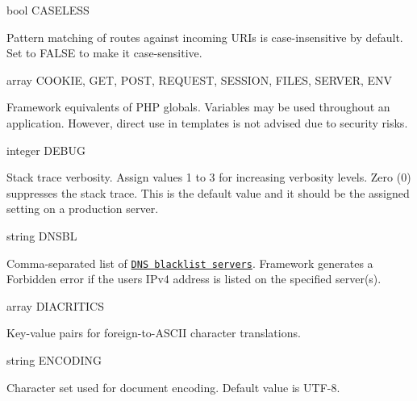 {\ttfamily bool C\+A\+S\+E\+L\+E\+SS}


\begin{DoxyItemize}
\item Pattern matching of routes against incoming U\+R\+Is is case-\/insensitive by default. Set to {\ttfamily F\+A\+L\+SE} to make it case-\/sensitive.
\end{DoxyItemize}

{\ttfamily array C\+O\+O\+K\+IE, G\+ET, P\+O\+ST, R\+E\+Q\+U\+E\+ST, S\+E\+S\+S\+I\+ON, F\+I\+L\+ES, S\+E\+R\+V\+ER, E\+NV}


\begin{DoxyItemize}
\item Framework equivalents of P\+HP globals. Variables may be used throughout an application. However, direct use in templates is not advised due to security risks.
\end{DoxyItemize}

{\ttfamily integer D\+E\+B\+UG}


\begin{DoxyItemize}
\item Stack trace verbosity. Assign values 1 to 3 for increasing verbosity levels. Zero (0) suppresses the stack trace. This is the default value and it should be the assigned setting on a production server.
\end{DoxyItemize}

{\ttfamily string D\+N\+S\+BL}


\begin{DoxyItemize}
\item Comma-\/separated list of \href{http://whatismyipaddress.com/blacklist-check}{\tt D\+NS blacklist servers}. Framework generates a { Forbidden} error if the user\textquotesingle{}s I\+Pv4 address is listed on the specified server(s).
\end{DoxyItemize}

{\ttfamily array D\+I\+A\+C\+R\+I\+T\+I\+CS}


\begin{DoxyItemize}
\item Key-\/value pairs for foreign-\/to-\/\+A\+S\+C\+II character translations.
\end{DoxyItemize}

{\ttfamily string E\+N\+C\+O\+D\+I\+NG}


\begin{DoxyItemize}
\item Character set used for document encoding. Default value is {\ttfamily U\+T\+F-\/8}.
\end{DoxyItemize}

